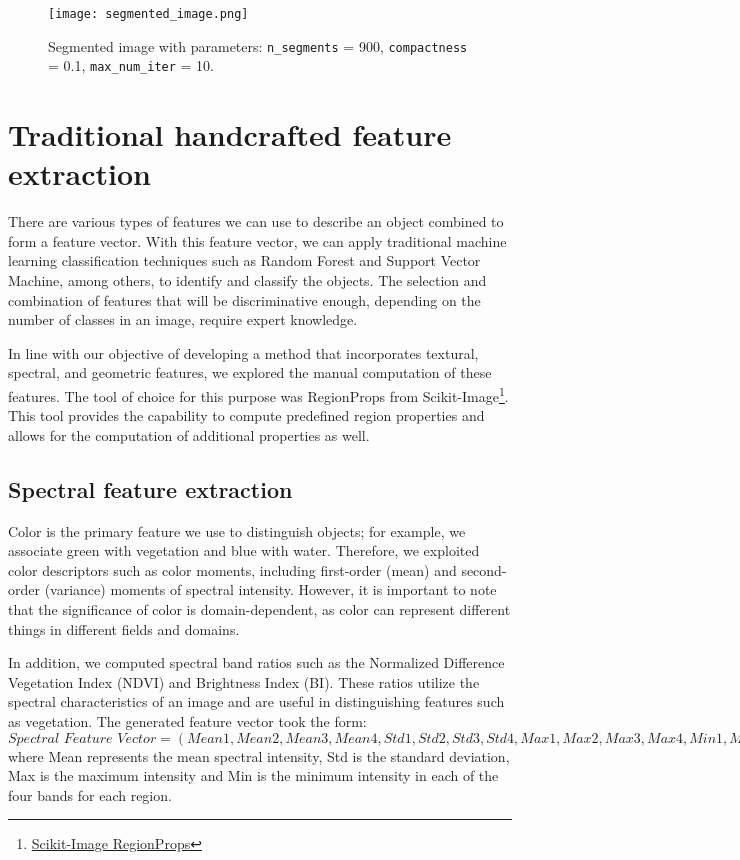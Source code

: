 \begin{figure}[h]
    \centering
    \texttt{[image: segmented\_image.png]}
    \caption{Segmented image with parameters: \texttt{n\_segments} = 900, \texttt{compactness} = 0.1, \texttt{max\_num\_iter} = 10.}
    \label{fig:segmented_image}
\end{figure}

\section{Traditional handcrafted feature extraction}
There are various types of features we can use to describe an object combined to form a feature vector. With this feature vector, we can apply traditional machine learning classification techniques such as Random Forest and Support Vector Machine, among others, to identify and classify the objects. The selection and combination of features that will be discriminative enough, depending on the number of classes in an image, require expert knowledge.

In line with our objective of developing a method that incorporates textural, spectral, and geometric features, we explored the manual computation of these features. The tool of choice for this purpose was RegionProps from Scikit-Image\footnote{\href{https://scikit-image.org/docs/stable/api/skimage.measure.html#skimage.measure.regionprops}{Scikit-Image RegionProps}}. This tool provides the capability to compute predefined region properties and allows for the computation of additional properties as well\cite{skimageregion}.

\subsection{Spectral feature extraction}
Color is the primary feature we use to distinguish objects; for example, we associate green with vegetation and blue with water. Therefore, we exploited color descriptors such as color moments, including first-order (mean) and second-order (variance) moments of spectral intensity. However, it is important to note that the significance of color is domain-dependent, as color can represent different things in different fields and domains.

In addition, we computed spectral band ratios such as the Normalized Difference Vegetation Index (NDVI) and Brightness Index (BI). These ratios utilize the spectral characteristics of an image and are useful in distinguishing features such as vegetation. The generated feature vector took the form:
\[
\textit{Spectral Feature Vector} = (\textit{Mean1}, \textit{Mean2}, \textit{Mean3}, \textit{Mean4}, \textit{Std1}, \textit{Std2}, \textit{Std3}, \textit{Std4},\textit{Max1}, \textit{Max2}, \textit{Max3}, \textit{Max4},\textit{Min1}, \textit{Min2}, \textit{Min3}, \textit{Min4}, \textit{NDVI}, \textit{BI})
\]
where Mean represents the mean spectral intensity, Std is the standard deviation, Max is the maximum intensity and Min is the minimum intensity in each of the four bands for each region.

